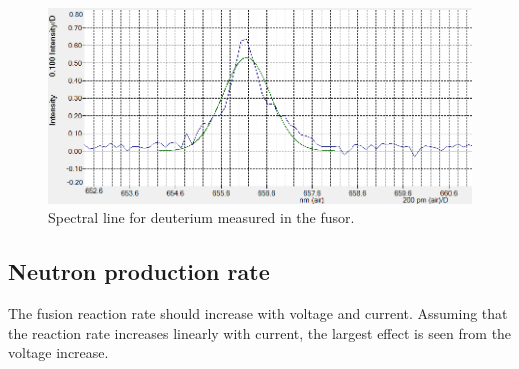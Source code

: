 \begin{figure}[h!]
	\centering
	\includegraphics[width=\textwidth]{Figures/D_linje.png}
	\caption{Spectral line for deuterium measured in the fusor.}
	\label{fig:Spectro}
\end{figure}

\subsection{Neutron production rate}

The fusion reaction rate should increase with voltage and current. Assuming that the reaction rate increases linearly with current, the largest effect is seen from the voltage increase. 